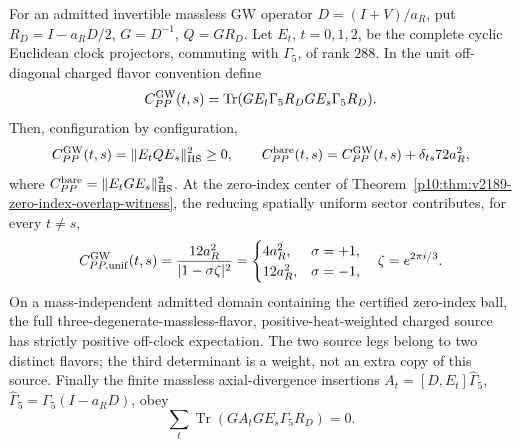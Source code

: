 \documentclass[12pt,a4paper]{article}
\begin{document}
\begin{theorem}
\label{p10:thm:v2217-temporal-gw-source}
For an admitted invertible massless GW operator
$D=(I+V)/a_R$, put $R_D=I-a_RD/2$, $G=D^{-1}$, $Q=GR_D$.
Let $E_t$, $t=0,1,2$, be the complete cyclic Euclidean clock projectors,
commuting with $\Gamma_5$, of rank $288$. In the unit off-diagonal charged
flavor convention define
\[
 C_{PP}^{\rm GW}(t,s)=\operatorname{Tr}
       (GE_t\Gamma_5R_DGE_s\Gamma_5R_D).
\]
Then, configuration by configuration,
\[
 C_{PP}^{\rm GW}(t,s)=\|E_tQE_s\|_{\rm HS}^2\ge0,\qquad
 C_{PP}^{\rm bare}(t,s)=C_{PP}^{\rm GW}(t,s)
                         +\delta_{ts}72a_R^2,
\]
where $C_{PP}^{\rm bare}=\|E_tGE_s\|_{\rm HS}^2$.
At the zero-index center of
Theorem~\ref{p10:thm:v2189-zero-index-overlap-witness}, the reducing
spatially uniform sector contributes, for every $t\ne s$,
\[
 C_{PP,\rm unif}^{\rm GW}(t,s)=
 \frac{12a_R^2}{|1-\sigma\zeta|^2}
 =\begin{cases}4a_R^2,&\sigma=+1,\\12a_R^2,&\sigma=-1,\end{cases}
 \quad\zeta=e^{2\pi i/3}.
\]
On a mass-independent admitted domain containing the certified zero-index
ball, the full three-degenerate-massless-flavor, positive-heat-weighted
charged source has strictly positive off-clock expectation. The two source
legs belong to two distinct flavors; the third determinant is a weight,
not an extra copy of this source.
Finally the finite massless axial-divergence insertions
$A_t=[D,E_t]\widehat\Gamma_5$, $\widehat\Gamma_5=\Gamma_5(I-a_RD)$,
obey
\[
 \sum_t\operatorname{Tr}(GA_tGE_s\Gamma_5R_D)=0.
\]
\end{theorem}
\end{document}
